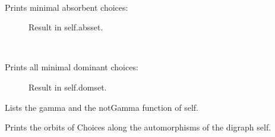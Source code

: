 \documentclass[letterpaper,10pt,english]{sphinxmanual}
\begin{document}
\begin{fulllineitems}
\begin{fulllineitems}
\begin{description}
\end{description}

\end{fulllineitems}


\begin{fulllineitems}
\label{techDoc:digraphs.Digraph.showMinAbs}~\begin{description}
\item[{Prints minimal absorbent choices:}] \leavevmode
Result in self.absset.

\end{description}

\end{fulllineitems}


\begin{fulllineitems}
\label{techDoc:digraphs.Digraph.showMinDom}~\begin{description}
\item[{Prints all minimal dominant choices:}] \leavevmode
Result in self.domset.

\end{description}

\end{fulllineitems}


\begin{fulllineitems}
\label{techDoc:digraphs.Digraph.showNeighborhoods}
Lists the gamma and the notGamma function of self.

\end{fulllineitems}


\begin{fulllineitems}
\label{techDoc:digraphs.Digraph.showOrbits}
Prints the orbits of Choices along the automorphisms of
the digraph self.

\end{fulllineitems}



\end{fulllineitems}
\end{document}
